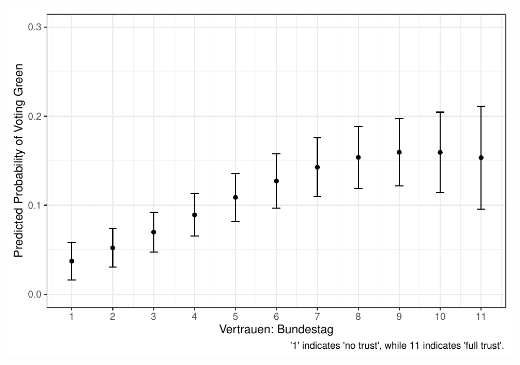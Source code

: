 \documentclass[
]{article}
\begin{document}
\includegraphics{AVCD_Final_Assignment-Edenhofer_files/figure-latex/gruene-trust-parliament-1.pdf}
\end{document}
